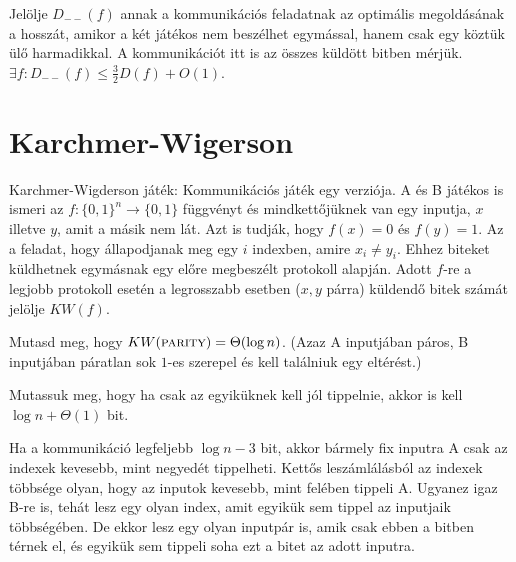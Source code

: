 \begin{Exercise}[counter={sorszam}, difficulty=2]
	 Jelölje $D_{--}(f)$ annak a kommunikációs feladatnak az optimális megoldásának a hosszát, amikor a két játékos nem beszélhet egymással, hanem csak egy köztük ülő harmadikkal. A kommunikációt itt is az összes küldött bitben mérjük. $\exists f: D_{--}(f)\leq \frac{3}{2} D(f)+O(1)$.
\end{Exercise}




\section{Karchmer-Wigerson}

 Karchmer-Wigderson j\'at\'ek: Kommunik\'aci\'os j\'at\'ek egy verzi\'oja. A \'es B játékos is ismeri az $f:\{0,1\}^n\rightarrow \{0,1\}$ függvényt \'es mindkett\H oj\"uknek van egy inputja, $x$ illetve $y$, amit a másik nem lát. Azt is tudj\'ak, hogy $f(x)=0$ \'es $f(y)=1$. Az a feladat, hogy állapodjanak meg egy $i$ indexben, amire $x_i\neq y_i$. Ehhez biteket küldhetnek egymásnak egy el\H ore megbeszélt protokoll alapján. Adott $f$-re a legjobb protokoll esetén a legrosszabb esetben ($x,y$ párra) k\"uldend\H o bitek sz\'am\'at jel\"olje $KW(f)$.

\begin{Exercise}[counter={sorszam}, difficulty=0]
	Mutasd meg, hogy $KW(\la{Parity})=\Theta(\log n)$. (Azaz A inputjában páros, B inputjában páratlan sok $1$-es szerepel és kell találniuk egy eltérést.)
\end{Exercise}

\begin{Exercise}[counter={sorszam}, difficulty=1]
	Mutassuk meg, hogy ha csak az egyik\"uknek kell j\'ol tippelnie, akkor is kell $\log n+\Theta(1)$ bit. 
\end{Exercise}
\begin{Answer}
	Ha a kommunik\'aci\'o legfeljebb $\log n-3$ bit, akkor b\'armely fix inputra A csak az indexek kevesebb, mint negyed\'et tippelheti.
	Kett\H os lesz\'aml\'al\'asb\'ol az indexek t\"obbs\'ege olyan, hogy az inputok kevesebb, mint fel\'eben tippeli A.
	Ugyanez igaz B-re is, teh\'at lesz egy olyan index, amit egyik\"uk sem tippel az inputjaik t\"obbs\'eg\'eben.
	De ekkor lesz egy olyan inputp\'ar is, amik csak ebben a bitben t\'ernek el, \'es egyik\"uk sem tippeli soha ezt a bitet az adott inputra.
\end{Answer}	

